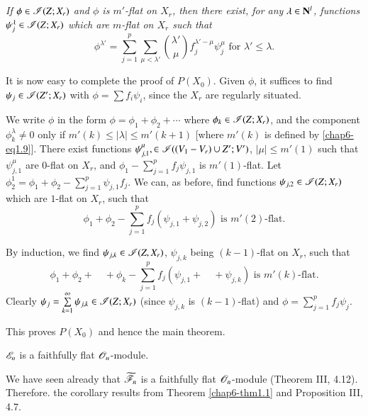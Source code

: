 \setcounter{subsection}{9}
\subsection{}\label{chap6-sec1.10}
{\em If $\phi\in \mathscr{I}(Z;X_{r})$ and $\phi$ is $m'$-flat on $X_{r}$, then there exist, for any $\lambda\in \mathbf{N}^{l}$, functions $\psi^{\lambda}_{j}\in \mathscr{I}(Z;X_{r})$ which are $m$-flat on $X_{r}$ such that}
\setcounter{equation}{10}
\begin{equation}
\phi^{\lambda'}=\sum\limits^{p}_{j=1}\sum\limits_{\mu<\lambda'}\binom{\lambda'}{\mu}f^{\lambda'-\mu}_{j}\psi^{\mu}_{j}\text{ for } \lambda'\leq \lambda.\label{chap6-eq1.11}
\end{equation}

It is now easy to complete the proof of $P(X_{0})$. Given $\phi$, it suffices to find $\psi_{j}\in \mathscr{I}(Z';X_{r})$ with $\phi=\sum f_{i}\psi_{i}$, since the $X_{r}$ are regularly situated.

We write $\phi$ in the form $\phi=\phi_{1}+\phi_{2}+\cdots$ where $\phi_{k}\in \mathscr{I}(Z;X_{r})$, and the component $\phi^{\lambda}_{k}\neq 0$ only if $m'(k)\leq |\lambda|\leq m'(k+1)$ [where $m'(k)$ is defined by \eqref{chap6-eq1.9}]. There exist functions $\psi^{\mu}_{j,1},\in \mathscr{I}((V_{1}-V_{r})\cup Z';V')$, $|\mu|\leq m'(1)$ such that $\psi^{\mu}_{j,1}$ are $0$-flat on $X_{r}$, and $\phi_{1}-\sum\limits^{p}_{j=1}f_{j}\psi_{j,1}$ is $m'(1)$-flat. Let $\phi^{1}_{2}=\phi_{1}+\phi_{2}-\sum\limits^{p}_{j=1}\psi_{j,1}f_{j}$. We can, as before, find functions $\psi_{j,2}\in \mathscr{I}(Z;X_{r})$ which are $1$-flat on $X_{r}$, such that
$$
\phi_{1}+\phi_{2}-\sum\limits^{p}_{j=1}f_{j}(\psi_{j,1}+\psi_{j,2})\text{ is } m'(2)\text{-flat.}
$$

By induction, we find $\psi_{j,k}\in \mathscr{I}(Z,X_{r})$, $\psi_{j,k}$ being $(k-1)$-flat on $X_{r}$, such that
$$
\phi_{1}+\phi_{2}+\quad+\phi_{k}-\sum\limits^{p}_{j=1}f_{j}(\psi_{j,1}+\quad+\psi_{j,k})\text{ is } m'(k)\text{-flat.}
$$
Clearly $\psi_{j}=\sum\limits^{\infty}_{k=1}\psi_{j,k}\in\mathscr{I}(Z;X_{r})$ (since $\psi_{j,k}$ is $(k-1)$-flat) and $\phi=\sum\limits^{p}_{j=1}f_{j}\psi_{j}$.

This proves $P(X_{0})$ and hence the main theorem.
\setcounter{theorem}{11}
\begin{corollary}\label{chap6-coro1.12}
$\mathscr{E}_{n}$ is a faithfully flat $\mathscr{O}_{n}$-module.
\end{corollary}

We have seen already that $\widetilde{\mathscr{F}}_{n}$ is a faithfully flat $\mathscr{O}_{n}$-module (Theorem III, 4.12). Therefore. the corollary results from Theorem \ref{chap6-thm1.1} and Proposition III, 4.7.

